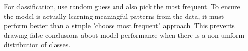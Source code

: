 For classification, use random guess and also pick the most frequent. To ensure the model is actually learning meaningful patterns from the data, it must perform better than a simple "choose most frequent" approach. This prevents drawing false conclusions about model performance when there is a non uniform distribution of classes.











